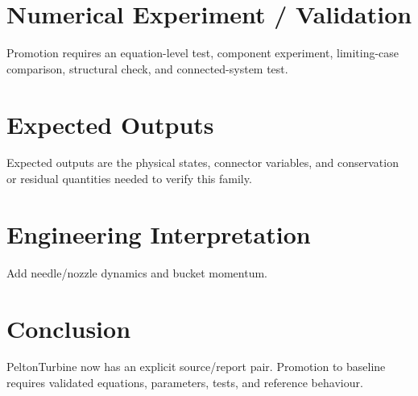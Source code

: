 \documentclass[10pt,a4paper]{article}
\begin{document}
\section{Numerical Experiment / Validation}Promotion requires an equation-level test, component experiment, limiting-case comparison, structural check, and connected-system test.
\section{Expected Outputs}Expected outputs are the physical states, connector variables, and conservation or residual quantities needed to verify this family.
\section{Engineering Interpretation}Add needle/nozzle dynamics and bucket momentum.
\section*{Conclusion}PeltonTurbine now has an explicit source/report pair. Promotion to baseline requires validated equations, parameters, tests, and reference behaviour.
\end{document}
